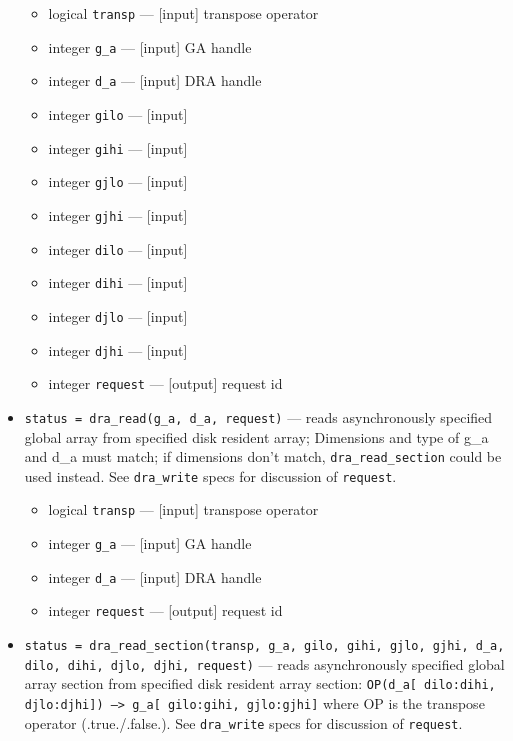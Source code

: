 \begin{itemize}
\begin{itemize}
\item              logical {\tt transp} ---               [input]  transpose operator
\item             integer {\tt g\_a} ---                  [input]  GA handle
\item              integer {\tt d\_a} ---                  [input]  DRA handle
\item              integer {\tt gilo} ---                 [input]
\item              integer {\tt gihi} ---                 [input]
\item              integer {\tt gjlo} ---                 [input]
\item              integer {\tt gjhi} ---                 [input]
\item              integer {\tt dilo} ---                 [input]
\item              integer {\tt dihi} ---                 [input]
\item              integer {\tt djlo} ---                 [input]
\item              integer {\tt djhi} ---                 [input]
\item              integer {\tt request} ---              [output]  request id
\end{itemize}

\item {\tt status = dra\_read(g\_a, d\_a, request)} ---
              reads asynchronously specified global array from specified
              disk resident array;
              Dimensions and type of g\_a and d\_a must match; if dimensions
              don't match, {\tt dra\_read\_section} could be used instead.
              See {\tt dra\_write} specs for discussion of {\tt request}. 

\begin{itemize}
\item              logical {\tt transp} ---               [input]  transpose operator
\item             integer {\tt g\_a} ---                  [input]  GA handle
\item              integer {\tt d\_a} ---                  [input]  DRA handle
\item              integer {\tt request} ---              [output]  request id
\end{itemize}

\item {\tt status = dra\_read\_section(transp, g\_a, gilo, gihi, gjlo, gjhi,
                                       d\_a, dilo, dihi, djlo, djhi, request)} --- 
              reads asynchronously specified global array section from 
              specified disk resident array section:
                {\tt OP(d\_a[ dilo:dihi, djlo:djhi]) --> g\_a[ gilo:gihi, gjlo:gjhi]}
              where OP is the transpose operator (.true./.false.).
              See {\tt dra\_write} specs for discussion of {\tt request}.


\end{itemize}
